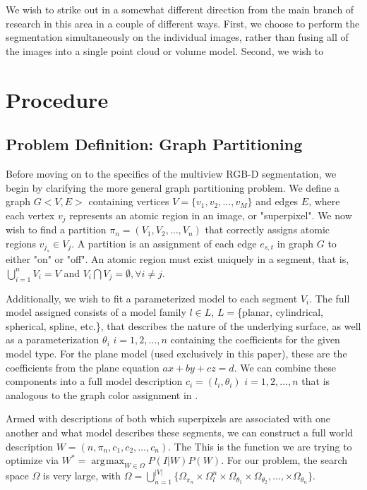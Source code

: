 \documentclass[10pt,letterpaper]{article}
\DeclareMathOperator*{\argmax}{arg\!max}
\begin{document}
	
	We wish to strike out in a somewhat different direction from the main branch of research in this area in a couple of different ways. First, we choose to perform the segmentation simultaneously on the individual images, rather than fusing all of the images into a single point cloud or volume model. Second, we wish to
	
	\cite{tu2002image}
	\cite{qiu2009jump}
	\cite{dick2002bayesian}
	
\cite{metropolis1953equation}
\cite{swendsen1987nonuniversal}
\cite{barbu2005generalizing}

\section{Procedure}

\subsection{Problem Definition: Graph Partitioning}

	Before moving on to the specifics of the multiview RGB-D segmentation, we begin by clarifying the more general graph partitioning problem. We define a graph $G<V,E>$ containing vertices $V=\{v_1,v_2,\ldots,v_M\}$ and edges $E$, where each vertex $v_j$ represents an atomic region in an image, or "superpixel". We now wish to find a partition $\pi_n=(V_1,V_2,\ldots,V_n)$ that correctly assigns atomic regions  $v_{j_s}\in{V_j}$. A partition is an assignment of each edge $e_{s,t}$ in graph $G$ to either "on" or "off". An atomic region must exist uniquely in a segment, that is, $\bigcup_{i=1}^{n}V_i=V$ and $V_i\bigcap{V_j}=\emptyset,\forall{i}\neq{j}$.
	
	Additionally, we wish to fit a parameterized model to each segment $V_i$. The full model assigned consists of a model family $l\in{L}$,  $L=$\{planar, cylindrical, spherical, spline, etc.\}, that describes the nature of the underlying surface, as well as a parameterization $\theta_i$ $i=1,2,\ldots,n$ containing the coefficients for the given model type. For the plane model (used exclusively in this paper), these are the coefficients from the plane equation $ax+by+cz=d$. We can combine these components into a full model description $c_i=(l_i,\theta_i)$ $i=1,2,\ldots,n$ that is analogous to the graph color assignment in \cite{swendsen1987nonuniversal}.
	
	Armed with descriptions of both which superpixels are associated with one another and what model describes these segments, we can construct a full world description $W=(n,\pi_n,c_1,c_2,\ldots,c_n)$. The  This is the function we are trying to optimize via $W^*={\argmax}_{W\in\Omega} P(I|W)P(W)$. For our problem, the search space $\Omega$ is very large, with $\Omega=\bigcup_{n=1}^{|V|}\{\Omega_{\pi_n} \times\Omega_{l}^n \times\Omega_{\theta_1} \times\Omega_{\theta_2},\ldots, \times\Omega_{\theta_n}\}$.
	
\end{document}
